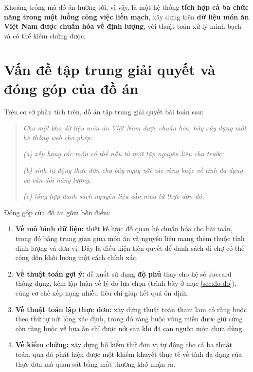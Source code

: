 Khoảng trống mà đồ án hướng tới, vì vậy, là một hệ thống \textbf{tích hợp cả ba
chức năng trong một luồng công việc liền mạch}, xây dựng trên \textbf{dữ liệu món
ăn Việt Nam được chuẩn hóa về định lượng}, với thuật toán xử lý minh bạch và có
thể kiểm chứng được.

\section{Vấn đề tập trung giải quyết và đóng góp của đồ án}
\label{sec:van-de}

Trên cơ sở phân tích trên, đồ án tập trung giải quyết bài toán sau:

\begin{quote}
\textit{Cho một kho dữ liệu món ăn Việt Nam được chuẩn hóa, hãy xây dựng một hệ
thống web cho phép:}

\textit{(a) xếp hạng các món có thể nấu từ một tập nguyên liệu cho trước;}

\textit{(b) sinh tự động thực đơn cho bảy ngày với các ràng buộc về tính đa dạng
và cân đối năng lượng;}

\textit{(c) tổng hợp danh sách nguyên liệu cần mua từ thực đơn đó.}
\end{quote}

Đóng góp của đồ án gồm bốn điểm:

\begin{enumerate}[label=\arabic*.]
  \item \textbf{Về mô hình dữ liệu:} thiết kế lược đồ quan hệ chuẩn hóa cho bài
        toán, trong đó bảng trung gian giữa món ăn và nguyên liệu mang thêm
        thuộc tính định lượng và đơn vị. Đây là điều kiện tiên quyết để danh sách
        đi chợ có thể cộng dồn khối lượng một cách chính xác.
  \item \textbf{Về thuật toán gợi ý:} đề xuất sử dụng \textbf{độ phủ} thay cho
        hệ số Jaccard thông dụng, kèm lập luận về lý do lựa chọn (trình bày ở mục
        \ref{sec:do-do}), cùng cơ chế xếp hạng nhiều tiêu chí giúp kết quả ổn
        định.
  \item \textbf{Về thuật toán lập thực đơn:} xây dựng thuật toán tham lam có ràng
        buộc theo thứ tự nới lỏng xác định, trong đó ràng buộc vùng miền được giữ
        cứng còn ràng buộc về bữa ăn chỉ được nới sau khi đã cạn nguồn món chưa
        dùng.
  \item \textbf{Về kiểm chứng:} xây dựng bộ kiểm thử đơn vị tự động cho cả ba
        thuật toán, qua đó phát hiện được một khiếm khuyết thực tế về tính đa
        dạng của thực đơn mà quan sát bằng mắt thường khó nhận ra.
\end{enumerate}
